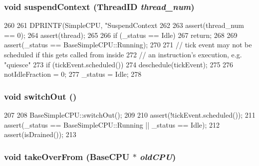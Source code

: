 \hypertarget{classAtomicSimpleCPU_a1dad4c4d2c3df4ef367e14fcc973ce74}{
\subsubsection[{suspendContext}]{\setlength{\rightskip}{0pt plus 5cm}void suspendContext ({\bf ThreadID} {\em thread\_\-num})}}
\label{classAtomicSimpleCPU_a1dad4c4d2c3df4ef367e14fcc973ce74}



\begin{DoxyCode}
260 {
261     DPRINTF(SimpleCPU, "SuspendContext %
262 
263     assert(thread_num == 0);
264     assert(thread);
265 
266     if (_status == Idle)
267         return;
268 
269     assert(_status == BaseSimpleCPU::Running);
270 
271     // tick event may not be scheduled if this gets called from inside
272     // an instruction's execution, e.g. "quiesce"
273     if (tickEvent.scheduled())
274         deschedule(tickEvent);
275 
276     notIdleFraction = 0;
277     _status = Idle;
278 }
\end{DoxyCode}
\hypertarget{classAtomicSimpleCPU_a05f299b443f8cc73a93d61572edc0218}{
\subsubsection[{switchOut}]{\setlength{\rightskip}{0pt plus 5cm}void switchOut ()}}
\label{classAtomicSimpleCPU_a05f299b443f8cc73a93d61572edc0218}



\begin{DoxyCode}
207 {
208     BaseSimpleCPU::switchOut();
209 
210     assert(!tickEvent.scheduled());
211     assert(_status == BaseSimpleCPU::Running || _status == Idle);
212     assert(isDrained());
213 }
\end{DoxyCode}
\hypertarget{classAtomicSimpleCPU_ac82d2b8d331b2e8e6854a95d2917dfa2}{
\subsubsection[{takeOverFrom}]{\setlength{\rightskip}{0pt plus 5cm}void takeOverFrom ({\bf BaseCPU} $\ast$ {\em oldCPU})}}
\label{classAtomicSimpleCPU_ac82d2b8d331b2e8e6854a95d2917dfa2}



